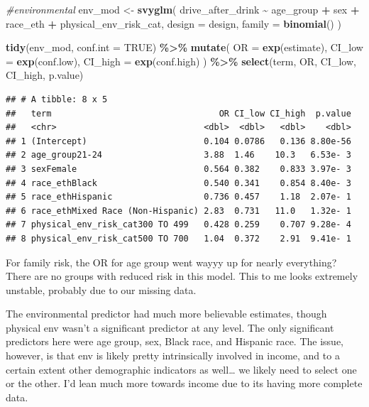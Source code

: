 \documentclass[
]{article}
\newenvironment{Shaded}{\begin{snugshade}}{\end{snugshade}}
\newcommand{\AttributeTok}[1]{\textcolor[rgb]{0.13,0.29,0.53}{#1}}
\newcommand{\CommentTok}[1]{\textcolor[rgb]{0.56,0.35,0.01}{\textit{#1}}}
\newcommand{\ConstantTok}[1]{\textcolor[rgb]{0.56,0.35,0.01}{#1}}
\newcommand{\FunctionTok}[1]{\textcolor[rgb]{0.13,0.29,0.53}{\textbf{#1}}}
\newcommand{\NormalTok}[1]{#1}
\newcommand{\OtherTok}[1]{\textcolor[rgb]{0.56,0.35,0.01}{#1}}
\newcommand{\SpecialCharTok}[1]{\textcolor[rgb]{0.81,0.36,0.00}{\textbf{#1}}}
\begin{document}
\begin{Shaded}
\begin{Highlighting}[]
\CommentTok{\#environmental }
\NormalTok{env\_mod }\OtherTok{\textless{}{-}} \FunctionTok{svyglm}\NormalTok{(}
\NormalTok{  drive\_after\_drink }\SpecialCharTok{\textasciitilde{}}\NormalTok{ age\_group }\SpecialCharTok{+}\NormalTok{ sex }\SpecialCharTok{+}\NormalTok{ race\_eth }\SpecialCharTok{+}
\NormalTok{  physical\_env\_risk\_cat,}
  \AttributeTok{design =}\NormalTok{ design,}
  \AttributeTok{family =} \FunctionTok{binomial}\NormalTok{()}
\NormalTok{)  }

\FunctionTok{tidy}\NormalTok{(env\_mod, }\AttributeTok{conf.int =} \ConstantTok{TRUE}\NormalTok{) }\SpecialCharTok{\%\textgreater{}\%}
  \FunctionTok{mutate}\NormalTok{(}
    \AttributeTok{OR =} \FunctionTok{exp}\NormalTok{(estimate),}
    \AttributeTok{CI\_low =} \FunctionTok{exp}\NormalTok{(conf.low),}
    \AttributeTok{CI\_high =} \FunctionTok{exp}\NormalTok{(conf.high)}
\NormalTok{  ) }\SpecialCharTok{\%\textgreater{}\%}
  \FunctionTok{select}\NormalTok{(term, OR, CI\_low, CI\_high, p.value)}
\end{Highlighting}
\end{Shaded}

\begin{verbatim}
## # A tibble: 8 x 5
##   term                                 OR CI_low CI_high  p.value
##   <chr>                             <dbl>  <dbl>   <dbl>    <dbl>
## 1 (Intercept)                       0.104 0.0786   0.136 8.80e-56
## 2 age_group21-24                    3.88  1.46    10.3   6.53e- 3
## 3 sexFemale                         0.564 0.382    0.833 3.97e- 3
## 4 race_ethBlack                     0.540 0.341    0.854 8.40e- 3
## 5 race_ethHispanic                  0.736 0.457    1.18  2.07e- 1
## 6 race_ethMixed Race (Non-Hispanic) 2.83  0.731   11.0   1.32e- 1
## 7 physical_env_risk_cat300 TO 499   0.428 0.259    0.707 9.28e- 4
## 8 physical_env_risk_cat500 TO 700   1.04  0.372    2.91  9.41e- 1
\end{verbatim}

For family risk, the OR for age group went wayyy up for nearly
everything? There are no groups with reduced risk in this model. This to
me looks extremely unstable, probably due to our missing data.

The environmental predictor had much more believable estimates, though
physical env wasn't a significant predictor at any level. The only
significant predictors here were age group, sex, Black race, and
Hispanic race. The issue, however, is that env is likely pretty
intrinsically involved in income, and to a certain extent other
demographic indicators as well\ldots{} we likely need to select one or
the other. I'd lean much more towards income due to its having more
complete data.
\end{document}
